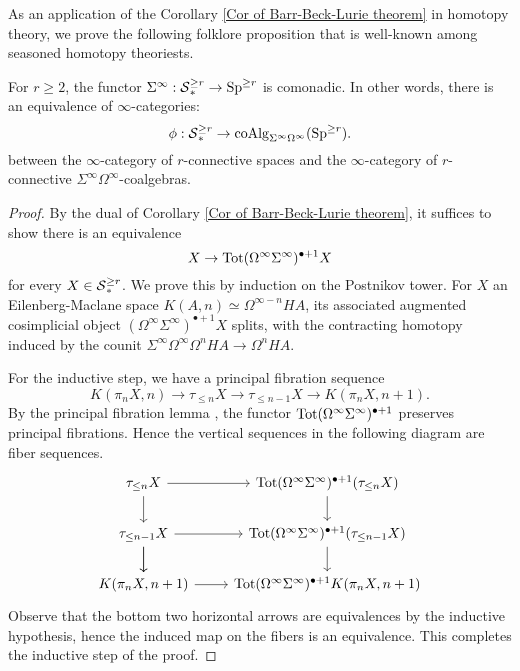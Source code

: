     As an application of the Corollary \ref{Cor of Barr-Beck-Lurie theorem} in homotopy theory, we prove the following folklore proposition that is well-known among seasoned homotopy theoriests.
\begin{proposition}
	\label{Coalgebra model for simply-connected spaces}
	For $r\geq 2$, the functor $\Sigma^{\infty}:\operatorname{\mathcal{S}}^{\geq r}_{*} \to \operatorname{Sp}^{\geq r}$ is comonadic. In other words, there is an equivalence of $\infty$-categories:
	\[
	\phi: \operatorname{\mathcal{S}}^{\geq r}_{*} \to \operatorname{coAlg}_{\Sigma^{\infty}\Omega^{\infty}}(\operatorname{Sp}^{\geq r}).
	\]
 between the $\infty$-category of $r$-connective spaces and the $\infty$-category of $r$-connective $\Sigma^{\infty}\Omega^{\infty}$-coalgebras.
\end{proposition}
\begin{proof}
By the dual of Corollary \ref{Cor of Barr-Beck-Lurie theorem}, it suffices to show there is an equivalence 
$$
X\to \operatorname{\operatorname{Tot}} (\Omega^{\infty}\Sigma^{\infty})^{\bullet+1}X
$$
for every $X\in \operatorname{\mathcal{S}}_{*}^{\geq r}$. We prove this by induction on the Postnikov tower. For $X$ an Eilenberg-Maclane space $K(A,n)\simeq \Omega^{\infty-n}HA$, its associated augmented cosimplicial object $(\Omega^{\infty}\Sigma^{\infty})^{\bullet+1}X$ splits, with the contracting homotopy induced by the counit $\Sigma^{\infty}\Omega^{\infty} \Omega^n HA\to \Omega^n HA$. 

For the inductive step, we have a principal fibration sequence
\[
K(\pi_n X,n) \to \tau_{\leq n}X \to \tau_{\leq n-1}X 
\to 
K(\pi_n X,n+1).
\]
By the principal fibration lemma \cite{Bousfield-KanYellow}, the functor $\operatorname{\operatorname{Tot}} (\Omega^{\infty}\Sigma^{\infty})^{\bullet+1}$ preserves principal fibrations. Hence the vertical sequences in the following diagram are fiber sequences.
\[
\begin{tikzcd}
	\tau_{\leq n}X & \Tot (\Omega^{\infty}\Sigma^{\infty})^{\bullet+1} (\tau_{\leq n}X)\\
	\tau_{\leq n-1}X  & \Tot (\Omega^{\infty}\Sigma^{\infty})^{\bullet+1} (\tau_{\leq n-1}X)\\
	K(\pi_n X,n+1)   & \Tot (\Omega^{\infty}\Sigma^{\infty})^{\bullet+1} K(\pi_n X,n+1)
	\arrow[from=1-1, to=1-2]
	\arrow[from=1-1, to=2-1]
	\arrow[from=2-1, to=2-2]
	\arrow[from=1-2, to=2-2]
	\arrow[from=2-1, to=3-1]
	\arrow[from=3-1, to=3-2]
	\arrow[from=2-1, to=3-1]
	\arrow[from=2-2, to=3-2]
\end{tikzcd}
\]
Observe that the bottom two horizontal arrows are equivalences by the inductive hypothesis, hence the induced map on the fibers is an equivalence. This completes the inductive step of the proof.
\end{proof}







